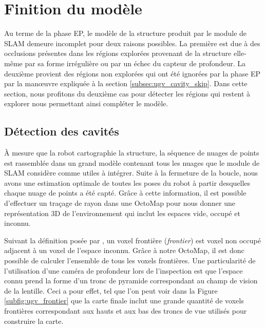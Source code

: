 \section{Finition du modèle} \label{sec:cavity_exploration}

Au terme de la phase EP, le modèle de la structure produit par le module de SLAM demeure incomplet pour deux raisons possibles. La première est due à des occlusions présentes dans les régions explorées provenant de la structure elle-même par sa forme irrégulière ou par un échec du capteur de profondeur. La deuxième provient des régions non explorées qui ont été ignorées par la phase EP par la man\oe uvre expliquée à la section \ref{subsec:ugv_cavity_skip}. Dans cette section, nous profitons du deuxième cas pour détecter les régions qui restent à explorer nous permettant ainsi compléter le modèle.

\subsection{Détection des cavités}

À mesure que la robot cartographie la structure, la séquence de nuages de points est rassemblée dans un grand modèle contenant tous les nuages que le module de SLAM considère comme utiles à intégrer. Suite à la fermeture de la boucle, nous avons une estimation optimale de toutes les poses du robot à partir desquelles chaque nuage de points a été capté. Grâce à cette information, il est possible d'effectuer un traçage de rayon dans une OctoMap \citep{Hornung2013} pour nous donner une représentation 3D de l'environnement qui inclut les espaces vide, occupé et inconnu.

Suivant la définition posée par \citep{Yamauchi1997}, un voxel frontière (\emph{frontier}) est voxel non occupé adjacent à un voxel de l'espace inconnu. Grâce à notre OctoMap, il est donc possible de calculer l'ensemble de tous les voxels frontières. Une particularité de l'utilisation d'une caméra de profondeur lors de l'inspection est que l'espace connu prend la forme d'un tronc de pyramide correspondant au champ de vision de la lentille. Ceci a pour effet, tel que l'on peut voir dans la Figure \ref{subfig:ugv_frontier} que la carte finale inclut une grande quantité de voxels frontières correspondant aux hauts et aux bas des troncs de vue utilisés pour construire la carte.

